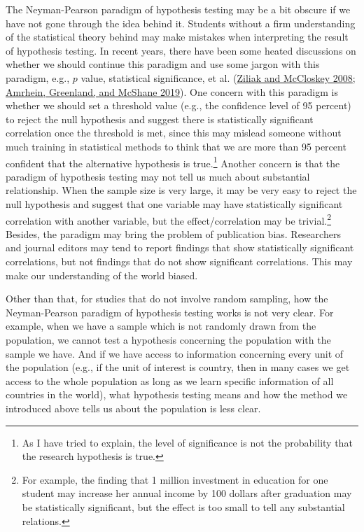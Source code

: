 \documentclass{book}
\begin{document}
The Neyman-Pearson paradigm of hypothesis testing may be a bit obscure if we
have not gone through the idea behind it. Students without a firm
understanding of the statistical theory behind may make mistakes when
interpreting the result of hypothesis testing. In recent years, there have
been some heated discussions on whether we should continue this paradigm and
use some jargon with this paradigm, e.g., \(p\) value, statistical
significance, et al. (\protect\hyperlink{ref-ziliak2008cult}{Ziliak and
McCloskey 2008}; \protect\hyperlink{ref-amrhein2019scientists}{Amrhein,
Greenland, and McShane 2019}). One concern with this paradigm is whether we
should set a threshold value (e.g., the confidence level of 95 percent) to
reject the null hypothesis and suggest there is statistically significant
correlation once the threshold is met, since this may mislead someone without
much training in statistical methods to think that we are more than 95 percent
confident that the alternative hypothesis is true.\footnote{As I have tried to
  explain, the level of significance is not the probability that the research
  hypothesis is true.} Another concern is that the paradigm of hypothesis
testing may not tell us much about substantial relationship. When the sample
size is very large, it may be very easy to reject the null hypothesis and
suggest that one variable may have statistically significant correlation with
another variable, but the effect/correlation may be trivial.\footnote{For
  example, the finding that 1 million investment in education for one student
  may increase her annual income by 100 dollars after graduation may be
  statistically significant, but the effect is too small to tell any
  substantial relations.} Besides, the paradigm may bring the problem of
publication bias. Researchers and journal editors may tend to report findings
that show statistically significant correlations, but not findings that do not
show significant correlations. This may make our understanding of the world
biased.

Other than that, for studies that do not involve random sampling, how the
Neyman-Pearson paradigm of hypothesis testing works is not very clear. For
example, when we have a sample which is not randomly drawn from the
population, we cannot test a hypothesis concerning the population with the
sample we have. And if we have access to information concerning every unit of
the population (e.g., if the unit of interest is country, then in many cases
we get access to the whole population as long as we learn specific information
of all countries in the world), what hypothesis testing means and how the
method we introduced above tells us about the population is less clear.
\end{document}
